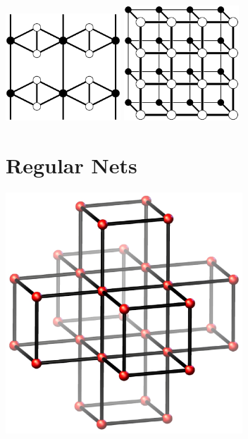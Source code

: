 \documentclass{beamer}
\begin{document}
\begin{frame}
  \begin{center}
    \includegraphics[width=1.7in]{unstable}
    \qquad
    \includegraphics[width=1.7in]{ladder}
  \end{center}
\end{frame}


\section{Regular Nets}

\begin{frame}
  \begin{center}
    \includegraphics[width=3.5in]{PrimitiveCubic-net}
  \end{center}
\end{frame}
\end{document}
